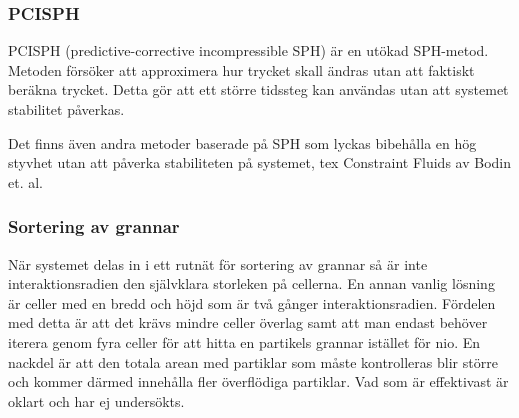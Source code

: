 \documentclass[a4paper,12pt,oneside,final]{extarticle}
\begin{document}
\subsubsection{PCISPH}
PCISPH (predictive-corrective incompressible SPH)\cite{solenthaler} är en utökad SPH-metod.
Metoden försöker att approximera hur trycket skall ändras utan att faktiskt beräkna trycket.
Detta gör att ett större tidssteg kan användas utan att systemet stabilitet påverkas.

Det finns även andra metoder baserade på SPH som lyckas bibehålla en hög styvhet utan att påverka stabiliteten på systemet, tex Constraint Fluids\cite{bodin} av Bodin et. al.

\subsubsection{Sortering av grannar}
När systemet delas in i ett rutnät för sortering av grannar så är inte interaktionsradien den självklara storleken på cellerna.
En annan vanlig lösning är celler med en bredd och höjd som är två gånger interaktionsradien.
Fördelen med detta är att det krävs mindre celler överlag samt att man endast behöver iterera genom fyra celler för att hitta en partikels grannar istället för nio.
En nackdel är att den totala arean med partiklar som måste kontrolleras blir större och kommer därmed innehålla fler överflödiga partiklar.
Vad som är effektivast är oklart och har ej undersökts.




\end{document}
